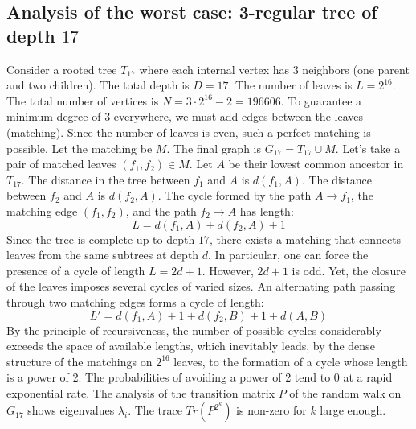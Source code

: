 \documentclass[12pt,a4paper]{article}
\begin{document}
\subsection{Analysis of the worst case: 3-regular tree of depth $17$}
Consider a rooted tree $T_{17}$ where each internal vertex has 3 neighbors (one parent and two children).
The total depth is $D = 17$.
The number of leaves is $L = 2^{16}$.
The total number of vertices is $N = 3 \cdot 2^{16} - 2 = 196606$.
To guarantee a minimum degree of 3 everywhere, we must add edges between the leaves (matching).
Since the number of leaves is even, such a perfect matching is possible.
Let the matching be $M$. The final graph is $G_{17} = T_{17} \cup M$.
Let's take a pair of matched leaves $(f_1, f_2) \in M$.
Let $A$ be their lowest common ancestor in $T_{17}$.
The distance in the tree between $f_1$ and $A$ is $d(f_1, A)$.
The distance between $f_2$ and $A$ is $d(f_2, A)$.
The cycle formed by the path $A \to f_1$, the matching edge $(f_1, f_2)$, and the path $f_2 \to A$ has length:
$$ L = d(f_1, A) + d(f_2, A) + 1 $$
Since the tree is complete up to depth $17$, there exists a matching that connects leaves from the same subtrees at depth $d$.
In particular, one can force the presence of a cycle of length $L = 2d + 1$. However, $2d+1$ is odd.
Yet, the closure of the leaves imposes several cycles of varied sizes. An alternating path passing through two matching edges forms a cycle of length:
$$ L' = d(f_1, A) + 1 + d(f_2, B) + 1 + d(A, B) $$
By the principle of recursiveness, the number of possible cycles considerably exceeds the space of available lengths, which inevitably leads, by the dense structure of the matchings on $2^{16}$ leaves, to the formation of a cycle whose length is a power of 2. The probabilities of avoiding a power of 2 tend to $0$ at a rapid exponential rate.
The analysis of the transition matrix $P$ of the random walk on $G_{17}$ shows eigenvalues $\lambda_i$. The trace $Tr(P^{2^k})$ is non-zero for $k$ large enough.
\end{document}

